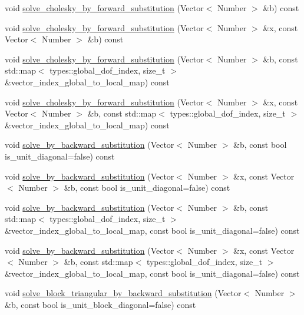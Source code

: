 \begin{DoxyCompactItemize}
\item 
void \hyperlink{classHMatrix_a09beb710b79d47e34ff3283424cf2a22}{solve\+\_\+cholesky\+\_\+by\+\_\+forward\+\_\+substitution} (Vector$<$ Number $>$ \&b) const
\item 
void \hyperlink{classHMatrix_a59d32edbfaac9221dc5e219640c3ecd3}{solve\+\_\+cholesky\+\_\+by\+\_\+forward\+\_\+substitution} (Vector$<$ Number $>$ \&x, const Vector$<$ Number $>$ \&b) const
\item 
void \hyperlink{classHMatrix_a987af3012854b397b90f19f742085155}{solve\+\_\+cholesky\+\_\+by\+\_\+forward\+\_\+substitution} (Vector$<$ Number $>$ \&b, const std\+::map$<$ types\+::global\+\_\+dof\+\_\+index, size\+\_\+t $>$ \&vector\+\_\+index\+\_\+global\+\_\+to\+\_\+local\+\_\+map) const
\item 
void \hyperlink{classHMatrix_a0b81214fb9287b344dff8349c7122583}{solve\+\_\+cholesky\+\_\+by\+\_\+forward\+\_\+substitution} (Vector$<$ Number $>$ \&x, const Vector$<$ Number $>$ \&b, const std\+::map$<$ types\+::global\+\_\+dof\+\_\+index, size\+\_\+t $>$ \&vector\+\_\+index\+\_\+global\+\_\+to\+\_\+local\+\_\+map) const
\item 
void \hyperlink{classHMatrix_ac7231b00a53ef6b860d774d1daad738f}{solve\+\_\+by\+\_\+backward\+\_\+substitution} (Vector$<$ Number $>$ \&b, const bool is\+\_\+unit\+\_\+diagonal=false) const
\item 
void \hyperlink{classHMatrix_ab89582b86090d18d33f7ae04deda1f5f}{solve\+\_\+by\+\_\+backward\+\_\+substitution} (Vector$<$ Number $>$ \&x, const Vector$<$ Number $>$ \&b, const bool is\+\_\+unit\+\_\+diagonal=false) const
\item 
void \hyperlink{classHMatrix_aedc13c9cf448ec8b47147053d02f357b}{solve\+\_\+by\+\_\+backward\+\_\+substitution} (Vector$<$ Number $>$ \&b, const std\+::map$<$ types\+::global\+\_\+dof\+\_\+index, size\+\_\+t $>$ \&vector\+\_\+index\+\_\+global\+\_\+to\+\_\+local\+\_\+map, const bool is\+\_\+unit\+\_\+diagonal=false) const
\item 
void \hyperlink{classHMatrix_aa90525e857add22b334bac84e6baacd2}{solve\+\_\+by\+\_\+backward\+\_\+substitution} (Vector$<$ Number $>$ \&x, const Vector$<$ Number $>$ \&b, const std\+::map$<$ types\+::global\+\_\+dof\+\_\+index, size\+\_\+t $>$ \&vector\+\_\+index\+\_\+global\+\_\+to\+\_\+local\+\_\+map, const bool is\+\_\+unit\+\_\+diagonal=false) const
\item 
void \hyperlink{classHMatrix_aa81db0ff79182302de83d693bab9f9e3}{solve\+\_\+block\+\_\+triangular\+\_\+by\+\_\+backward\+\_\+substitution} (Vector$<$ Number $>$ \&b, const bool is\+\_\+unit\+\_\+block\+\_\+diagonal=false) const

\end{DoxyCompactItemize}
